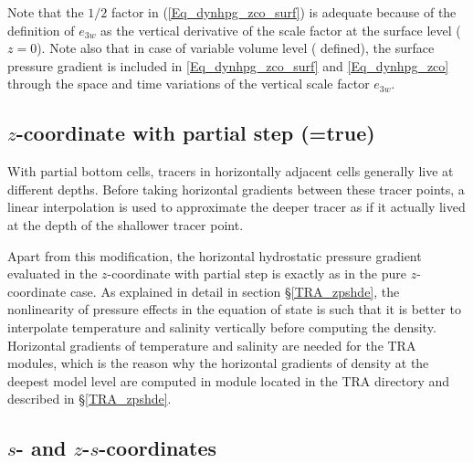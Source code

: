 \documentclass[NEMO_book]{subfiles}
\begin{document}
Note that the $1/2$ factor in (\ref{Eq_dynhpg_zco_surf}) is adequate because of 
the definition of $e_{3w}$ as the vertical derivative of the scale factor at the surface 
level ($z=0$). Note also that in case of variable volume level ( defined), the 
surface pressure gradient is included in \eqref{Eq_dynhpg_zco_surf} and \eqref{Eq_dynhpg_zco} 
through the space and time variations of the vertical scale factor $e_{3w}$.

\subsection   [$z$-coordinate with partial step (\np{ln\_dynhpg\_zps})]
			{$z$-coordinate with partial step (=true)}
\label{DYN_hpg_zps}

With partial bottom cells, tracers in horizontally adjacent cells generally live at 
different depths. Before taking horizontal gradients between these tracer points, 
a linear interpolation is used to approximate the deeper tracer as if it actually lived 
at the depth of the shallower tracer point. 

Apart from this modification, the horizontal hydrostatic pressure gradient evaluated 
in the $z$-coordinate with partial step is exactly as in the pure $z$-coordinate case. 
As explained in detail in section \S\ref{TRA_zpshde}, the nonlinearity of pressure 
effects in the equation of state is such that it is better to interpolate temperature and 
salinity vertically before computing the density. Horizontal gradients of temperature 
and salinity are needed for the TRA modules, which is the reason why the horizontal 
gradients of density at the deepest model level are computed in module  
located in the TRA directory and described in \S\ref{TRA_zpshde}.

\subsection{$s$- and $z$-$s$-coordinates}
\label{DYN_hpg_sco}
\end{document}
